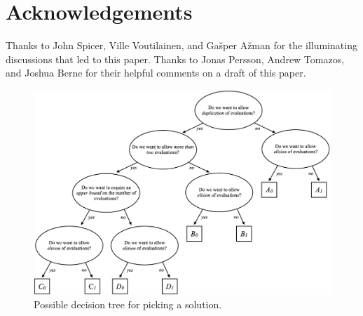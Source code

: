 

\section*{Acknowledgements}
Thanks to John Spicer, Ville Voutilainen, and Ga\v sper A\v zman for the illuminating discussions that led to this paper. Thanks to Jonas Persson, Andrew Tomazos, and Joshua Berne for their helpful comments on a draft of this paper.

\pagebreak %


\begin{figure}[!htbp]
\centering
  \includegraphics[width=1\linewidth]{images/p3228_fig1.png}
  \vspace{5mm}
  \caption{Possible decision tree for picking a solution.}
  \label{fig:prepost}
\end{figure}

\pagebreak %

\renewcommand{\bibname}{References}





